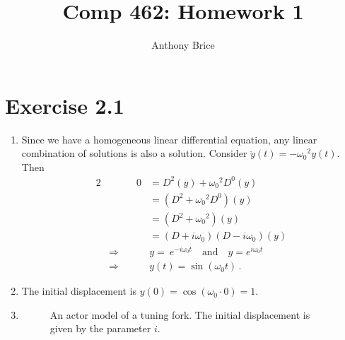 \documentclass{abrice}
\title{Comp 462: Homework 1}
\author{Anthony Brice}
\begin{document}
\maketitle

\section{Exercise 2.1}
\begin{enumerate}[label= (\alph*)]
\item Since we have a homogeneous linear differential equation, any linear combination of solutions
  is also a solution. Consider $\ddot{y}(t) = - {\omega_0}^2
  y(t)$. Then
  \begin{alignat*}{2}
    && 0 &= D^2(y) + {\omega_0}^2 D^0(y) \\
    && &= (D^2 + {\omega_0}^2 D^0)(y) \\
    && &= (D^2 + {\omega_0}^2)(y) \\
    && &= (D + i \omega_0)(D - i \omega_0)(y) \\
    &\Rightarrow \quad && y = \ e^{-i \omega_0 t}\quad \textrm{and}\quad y = e^{i
      \omega_0 t} \\
    &\Rightarrow \quad && y(t) = \sin(\omega_0 t)\, .
  \end{alignat*}
\item The initial displacement is $y(0) = \cos(\omega_0 \cdot 0) = 1$.
\item \hfill
  \begin{figure}
    \caption{An actor model of a tuning fork. The initial displacement is given
      by the parameter $i$.}
    \centering
  \end{figure}
\end{enumerate}
\end{document}
